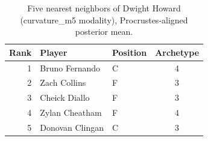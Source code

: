 \begin{table}[htbp]
  \centering\small
  \begin{tabular}{rllc}
    \toprule
    Rank & Player & Position & Archetype \\
    \midrule
    1 & Bruno Fernando & C & 4 \\
    2 & Zach Collins & F & 3 \\
    3 & Cheick Diallo & F & 3 \\
    4 & Zylan Cheatham & F & 4 \\
    5 & Donovan Clingan & C & 3 \\
    \bottomrule
  \end{tabular}
  \caption{Five nearest neighbors of Dwight Howard (curvature_m5 modality), Procrustes-aligned posterior mean.}
  \label{tab:Dwight_Howard_neighbors_curvature_m5}
\end{table}


